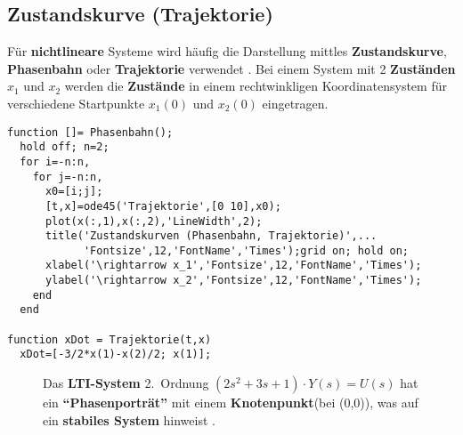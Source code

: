 {\subsection{Zustandskurve (Trajektorie)}
F\"ur {\bf nichtlineare} Systeme wird
h\"aufig die Darstellung mittles {\bf Zustandskurve}, {\bf Phasenbahn}
oder {\bf Trajektorie} verwendet \cite{UNB:89}. Bei
einem System mit 2 {\bf Zust\"anden} $x_1$ und $x_2$ werden die {\bf
  Zust\"ande} in einem rechtwinkligen Koordinatensystem
f\"ur verschiedene Startpunkte $x_1(0)$ und $x_2(0)$ eingetragen.  
\begin{small}
\begin{verbatim}
function []= Phasenbahn(); 
  hold off; n=2;
  for i=-n:n,
    for j=-n:n,
      x0=[i;j];
      [t,x]=ode45('Trajektorie',[0 10],x0); 
      plot(x(:,1),x(:,2),'LineWidth',2);
      title('Zustandskurven (Phasenbahn, Trajektorie)',... 
            'Fontsize',12,'FontName','Times');grid on; hold on; 
      xlabel('\rightarrow x_1','Fontsize',12,'FontName','Times');
      ylabel('\rightarrow x_2','Fontsize',12,'FontName','Times');
    end
  end

function xDot = Trajektorie(t,x) 
  xDot=[-3/2*x(1)-x(2)/2; x(1)];
\end{verbatim}
\end{small}
\begin{figure}[!htb] %
  \vspace*{-4mm}\begin{center}
    \vspace*{-3mm}\caption{Das {\bf LTI-System} 2.~Ordnung $(2s^2+3s+1)\cdot Y(s)=U(s)$ hat ein {\bf ``Phasenportr\"at''} mit einem {\bf Knotenpunkt}(bei (0,0)), was auf ein {\bf stabiles System} hinweist \cite{UNB:89}.}\label{ZVD_ABB_phasenbahn}
\end{center}
\vspace*{-6mm}
\end{figure}    

}
